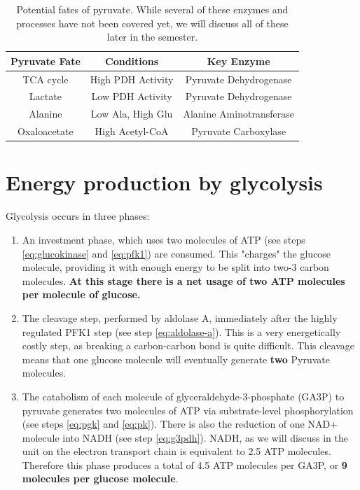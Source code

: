 \documentclass{tufte-handout}
\begin{document}
\begin{table}
\centering
\caption{Potential fates of pyruvate.  While several of these enzymes and processes have not been covered yet, we will discuss all of these later in the semester.}
\label{tab:pyruvate-fates}
\begin{tabular}{ccc}
\hline
\textbf {Pyruvate Fate} & \textbf{Conditions}  & \textbf{Key Enzyme} \\
\hline
TCA cycle & High PDH Activity & Pyruvate Dehydrogenase \\
Lactate & Low PDH Activity & Pyruvate Dehydrogenase \\
Alanine & Low Ala, High Glu & Alanine Aminotransferase\\
Oxaloacetate & High Acetyl-CoA & Pyruvate Carboxylase \\
\hline
\end{tabular}
\end{table}

\section{Energy production by glycolysis}

Glycolysis occurs in three phases:

\begin{enumerate}
\item An investment phase, which uses two molecules of ATP (see steps \ref{eq:glucokinase} and \ref{eq:pfk1}) are consumed.  This "charges" the glucose molecule, providing it with enough energy to be split into two-3 carbon molecules.  \textbf{At this stage there is a net usage of two ATP molecules per molecule of glucose.}
\item The cleavage step, performed by aldolase A, immediately after the highly regulated PFK1 step (see step \ref{eq:aldolase-a}).  This is a very energetically costly step, as breaking a carbon-carbon bond is quite difficult.  This cleavage means that one glucose molecule will eventually generate \textbf{two} Pyruvate molecules.
\item The catabolism of each molecule of glyceraldehyde-3-phosphate (GA3P) to pyruvate generates two molecules of ATP via substrate-level phosphorylation (see steps \ref{eq:pgk} and \ref{eq:pk}).  There is also the reduction of one NAD+ molecule into NADH (see step \ref{eq:g3pdh}).  NADH, as we will discuss in the unit on the electron transport chain is equivalent to 2.5 ATP molecules.  Therefore this phase produces a total of 4.5 ATP molecules per GA3P, or \textbf{9 molecules per glucose molecule}.
\end{enumerate}
\end{document}
